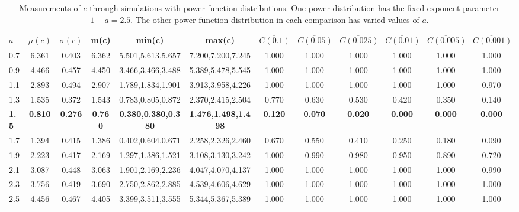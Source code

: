 \begin{table*}[h!]
\begin{center}
\begin{tabular}{| l | c | c | c | c | c | c | c | c | c | c | c |}\hline
$a$ & $\mu(c)$ & $\sigma(c)$ & m(c) & min(c) & max(c) & $\overline{C(0.1)}$ & $\overline{C(0.05)}$ & $\overline{C(0.025)}$ & $\overline{C(0.01)}$ & $\overline{C(0.005)}$ & $\overline{C(0.001)}$ \\\hline\hline
0.7 & 6.361 & 0.403 & 6.362 & 5.501,5.613,5.657 & 7.200,7.200,7.245  & 1.000  & 1.000  & 1.000  & 1.000  & 1.000  & 1.000 \\\hline
0.9 & 4.466 & 0.457 & 4.450 & 3.466,3.466,3.488 & 5.389,5.478,5.545  & 1.000  & 1.000  & 1.000  & 1.000  & 1.000  & 1.000 \\\hline
1.1 & 2.893 & 0.494 & 2.907 & 1.789,1.834,1.901 & 3.913,3.958,4.226  & 1.000  & 1.000  & 1.000  & 1.000  & 1.000  & 0.970 \\\hline
1.3 & 1.535 & 0.372 & 1.543 & 0.783,0.805,0.872 & 2.370,2.415,2.504  & 0.770  & 0.630  & 0.530  & 0.420  & 0.350  & 0.140 \\\hline
{\bf 1.5} & {\bf 0.810} & {\bf 0.276} & {\bf 0.760} & {\bf 0.380,0.380,0.380} & {\bf 1.476,1.498,1.498} & {\bf 0.120} & {\bf 0.070} & {\bf 0.020} & {\bf 0.000} & {\bf 0.000} & {\bf 0.000} \\\hline
1.7 & 1.394 & 0.415 & 1.386 & 0.402,0.604,0.671 & 2.258,2.326,2.460  & 0.670  & 0.550  & 0.410  & 0.250  & 0.180  & 0.090 \\\hline
1.9 & 2.223 & 0.417 & 2.169 & 1.297,1.386,1.521 & 3.108,3.130,3.242  & 1.000  & 0.990  & 0.980  & 0.950  & 0.890  & 0.720 \\\hline
2.1 & 3.087 & 0.448 & 3.063 & 1.901,2.169,2.236 & 4.047,4.070,4.137  & 1.000  & 1.000  & 1.000  & 1.000  & 1.000  & 0.990 \\\hline
2.3 & 3.756 & 0.419 & 3.690 & 2.750,2.862,2.885 & 4.539,4.606,4.629  & 1.000  & 1.000  & 1.000  & 1.000  & 1.000  & 1.000 \\\hline
2.5 & 4.456 & 0.467 & 4.405 & 3.399,3.511,3.555 & 5.344,5.367,5.389  & 1.000  & 1.000  & 1.000  & 1.000  & 1.000  & 1.000 \\\hline
\end{tabular}
\caption{Measurements of $c$ through simulations
        with power function distributions.
        One power distribution has the fixed exponent parameter $1-a=2.5$.
        The other power function distribution in each comparison
        has varied values of $a$.}
\end{center}
\end{table*}